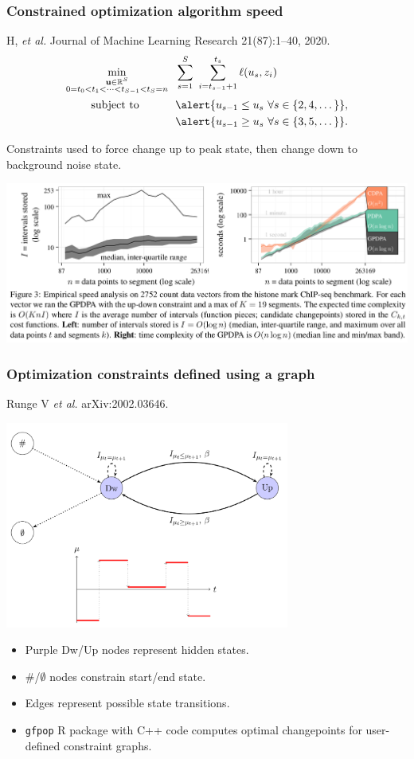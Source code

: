 \documentclass{beamer}
\newcommand{\RR}{\mathbb R}
\begin{document}
\begin{frame}
  \frametitle{Constrained optimization algorithm speed}
  H, {\it et al.} Journal of Machine Learning Research 21(87):1--40, 2020. 
\vskip -0.5cm
\begin{align*}
\min_{\substack{
  \mathbf u\in\RR^{S}
\\
   0=t_0<t_1<\cdots<t_{S-1}<t_S=n
}} & \ \
    \sum_{s=1}^S\  \sum_{i=t_{s-1}+1}^{t_s} \ell( u_s,  z_i) 
\\
      \text{subject to \hskip 0.8cm} &\ \ 
\alert{ u_{s-1} \leq u_s\ \forall s\in\{2,4,\dots\} },
  \nonumber\\
  &\ \ 
\alert{ u_{s-1} \geq u_s\ \forall s\in\{3,5,\dots\} }.
  \nonumber
\end{align*}

\alert{Constraints used to force change up to peak state, then change
  down to background noise state.}

\includegraphics[width=\textwidth]{screenshot-GPDPA-intervals}

\end{frame}

\begin{frame}
  \frametitle{Optimization constraints defined using a graph}
  Runge V \emph{et al.} arXiv:2002.03646.

  \includegraphics[width=0.7\textwidth]{gfpop-up-down}

  \begin{itemize}
  \item Purple Dw/Up nodes represent hidden states.
  \item \#/$\emptyset$ nodes constrain start/end state.
  \item Edges represent possible state transitions.
  \item \texttt{gfpop} R package with C++ code computes optimal
    changepoints for user-defined constraint graphs.
  \end{itemize}

\end{frame}
\end{document}

